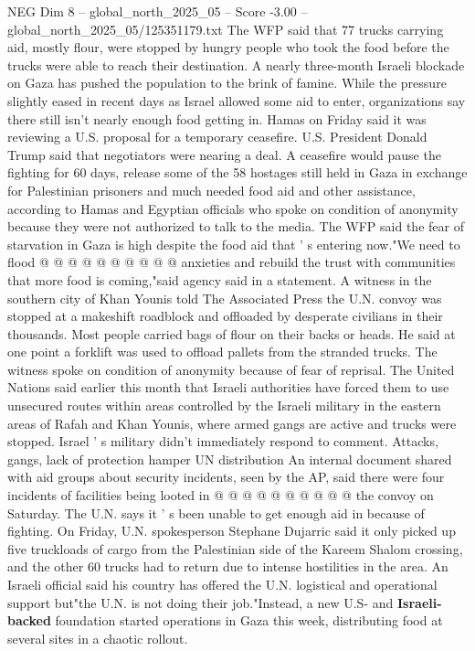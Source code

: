 \begin{textsample}{NEG Dim 8 – global\_north\_2025\_05 – Score -3.00 – global\_north\_2025\_05/125351179.txt}  \label{ex:f8_neg_055}
The WFP said that 77 trucks carrying aid, mostly flour, were stopped by hungry people who took the food before the trucks were able to reach their destination.
A nearly three-month Israeli blockade on Gaza has pushed the population to the brink of famine.
While the pressure slightly eased in recent days as Israel allowed some aid to enter, organizations say there still isn't nearly enough food getting in.
Hamas on Friday said it was reviewing a U.S. proposal for a temporary ceasefire.
U.S.
President Donald Trump said that negotiators were nearing a deal.
A ceasefire would pause the fighting for 60 days, release some of the 58 hostages still held in Gaza in exchange for Palestinian prisoners and much needed food aid and other assistance, according to Hamas and Egyptian officials who spoke on condition of anonymity because they were not authorized to talk to the media.
The WFP said the fear of starvation in Gaza is high despite the food aid that ' s entering now."We need to flood @ @ @ @ @ @ @ @ @ @ anxieties and rebuild the trust with communities that more food is coming,"said agency said in a statement.
A witness in the southern city of Khan Younis told The Associated Press the U.N. convoy was stopped at a makeshift roadblock and offloaded by desperate civilians in their thousands.
Most people carried bags of flour on their backs or heads.
He said at one point a forklift was used to offload pallets from the stranded trucks.
The witness spoke on condition of anonymity because of fear of reprisal.
The United Nations said earlier this month that Israeli authorities have forced them to use unsecured routes within areas controlled by the Israeli military in the eastern areas of Rafah and Khan Younis, where armed gangs are active and trucks were stopped.
Israel ' s military didn't immediately respond to comment.
Attacks, gangs, lack of protection hamper UN distribution An internal document shared with aid groups about security incidents, seen by the AP, said there were four incidents of facilities being looted in @ @ @ @ @ @ @ @ @ @ the convoy on Saturday.
The U.N. says it ' s been unable to get enough aid in because of fighting.
On Friday, U.N. spokesperson Stephane Dujarric said it only picked up five truckloads of cargo from the Palestinian side of the Kareem Shalom crossing, and the other 60 trucks had to return due to intense hostilities in the area.
An Israeli official said his country has offered the U.N. logistical and operational support but"the U.N. is not doing their job."Instead, a new U.S- and \textbf{Israeli-backed} foundation started operations in Gaza this week, distributing food at several sites in a chaotic rollout.

\end{textsample}
